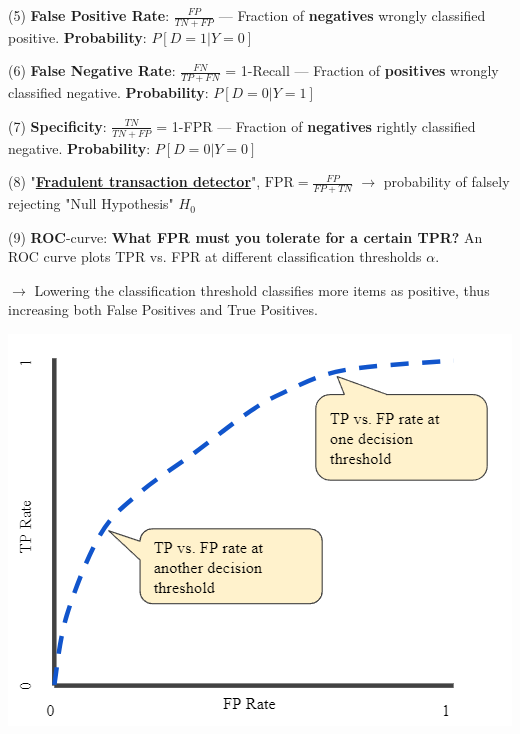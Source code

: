 \documentclass[letterpaper, 10.5pt,landscape]{article}
\begin{document}
\begin{multicols*}{3}
(5) \textbf{False Positive Rate}: \(\boxed{\frac{FP}{TN+FP}} \)  — Fraction of \textbf{negatives} wrongly classified positive.  \textbf{Probability}: $\boxed{P[D=1 | Y=0]}$

\vspace{2pt}
(6) \textbf{False Negative Rate}: \(\boxed{\frac{FN}{TP+FN}} \) = 1-Recall  — Fraction of \textbf{positives} wrongly classified negative.  \textbf{Probability}: $\boxed{P[D=0 | Y=1]}$

\vspace{2pt}

(7) \textbf{Specificity}: \(\boxed{\frac{TN}{TN+FP}} \) = 1-FPR  — Fraction of \textbf{negatives} rightly classified negative.  \textbf{Probability}: $\boxed{P[D=0 | Y=0]}$

\vspace{2pt}

(8) "\underline{\textbf{Fradulent transaction detector}}", $\boxed{\text{FPR} = \frac{FP}{FP+TN}}$ $\rightarrow$ probability of falsely rejecting "Null Hypothesis" $H_{0}$

\vspace{2pt}

(9) \textbf{ROC}-curve: \textbf{What FPR must you tolerate for a certain TPR?} An ROC curve plots TPR vs. FPR at different classification thresholds $\alpha$.


$\rightarrow$ Lowering the classification threshold classifies more items as positive, thus increasing both False Positives and True Positives.

\vspace{-3pt}

\begin{center}
    \begin{minipage}{0.75\linewidth}
        \includegraphics[width=\textwidth]{figures/ROC_curve.PNG}
    \end{minipage}
\end{center}


\end{multicols*}
\end{document}
